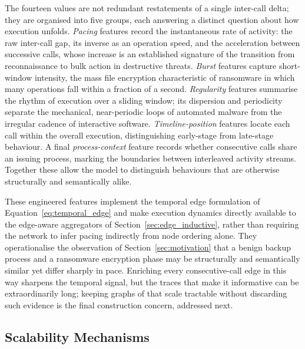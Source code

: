 \documentclass[%
    BCOR=10mm,
    DIV=13,
    toc=bibliography,
    toc=listof,
    oneside,
    12pt,
]{scrbook}
\begin{document}
The fourteen values are not redundant restatements of a single inter-call
delta; they are organised into five groups, each answering a distinct question
about how execution unfolds. \emph{Pacing} features record the instantaneous
rate of activity: the raw inter-call gap, its inverse as an operation speed,
and the acceleration between successive calls, whose increase is an established
signature of the transition from reconnaissance to bulk action in destructive
threats. \emph{Burst} features capture short-window intensity, the mass file
encryption characteristic of ransomware in which many operations fall within a
fraction of a second. \emph{Regularity} features summarise the rhythm of
execution over a sliding window; its dispersion and periodicity separate the
mechanical, near-periodic loops of automated malware from the irregular cadence
of interactive software. \emph{Timeline-position} features locate each call
within the overall execution, distinguishing early-stage from late-stage
behaviour. A final \emph{process-context} feature records whether consecutive
calls share an issuing process, marking the boundaries between interleaved
activity streams. Together these allow the model to distinguish behaviours that
are otherwise structurally and semantically alike.

These engineered features implement the temporal edge formulation of
Equation~\ref{eq:temporal_edge} and make execution dynamics directly available
to the edge-aware aggregators of Section~\ref{sec:edge_inductive}, rather than
requiring the network to infer pacing indirectly from node ordering alone.
They operationalise the observation of Section~\ref{sec:motivation} that a
benign backup process and a ransomware encryption phase may be structurally
and semantically similar yet differ sharply in pace. Enriching every
consecutive-call edge in this way sharpens the temporal signal, but the traces
that make it informative can be extraordinarily long; keeping graphs of that
scale tractable without discarding such evidence is the final construction
concern, addressed next.

\subsection{Scalability Mechanisms}
\label{subsec:scalability}
\end{document}
